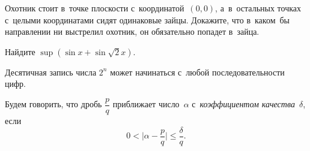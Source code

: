 \documentclass[a4paper, 12pt]{article}
\begin{document}



%







Охотник стоит в~точке плоскости с~координатой~$(0,0)$, а~в~остальных точках с~целыми координатами сидят одинаковые зайцы. Докажите, что в~каком~бы направлении ни выстрелил охотник, он обязательно попадет в~зайца.






Найдите $\sup\left(\sin x+\sin\sqrt2x\right)$.






Десятичная запись числа $2^n$ может начинаться с~любой последовательности цифр.






Будем говорить, что дробь $\dfrac pq$ приближает число~$\alpha$ с~\emph{коэффициентом качества}~$\delta$,
если
\[
0<\bigl|\alpha-\frac pq\bigr|\leqslant\frac\delta q.
\]
\end{document}
